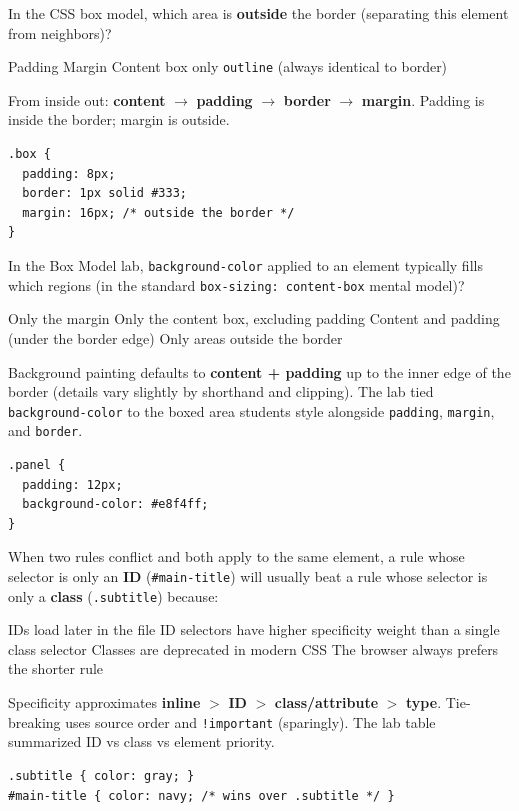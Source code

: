 \question[4]
In the CSS box model, which area is \textbf{outside} the border (separating this element from neighbors)?
\begin{choices}
  \choice Padding
  \CorrectChoice Margin
  \choice Content box only
  \choice \texttt{outline} (always identical to border)
\end{choices}
\begin{solution}
  From inside out: \textbf{content} $\rightarrow$ \textbf{padding} $\rightarrow$ \textbf{border} $\rightarrow$ \textbf{margin}. Padding is inside the border; margin is outside.
\begin{lstlisting}[style=cssinline]
.box {
  padding: 8px;
  border: 1px solid #333;
  margin: 16px; /* outside the border */
}
\end{lstlisting}
\end{solution}

\question[4]
In the Box Model lab, \texttt{background-color} applied to an element typically fills which regions (in the standard \texttt{box-sizing: content-box} mental model)?
\begin{choices}
  \choice Only the margin
  \choice Only the content box, excluding padding
  \CorrectChoice Content and padding (under the border edge)
  \choice Only areas outside the border
\end{choices}
\begin{solution}
  Background painting defaults to \textbf{content + padding} up to the inner edge of the border (details vary slightly by shorthand and clipping). The lab tied \texttt{background-color} to the boxed area students style alongside \texttt{padding}, \texttt{margin}, and \texttt{border}.
\begin{lstlisting}[style=cssinline]
.panel {
  padding: 12px;
  background-color: #e8f4ff;
}
\end{lstlisting}
\end{solution}


\newpage
\question[4]
When two rules conflict and both apply to the same element, a rule whose selector is only an \textbf{ID} (\texttt{\#main-title}) will usually beat a rule whose selector is only a \textbf{class} (\texttt{.subtitle}) because:
\begin{choices}
  \choice IDs load later in the file
  \CorrectChoice ID selectors have higher specificity weight than a single class selector
  \choice Classes are deprecated in modern CSS
  \choice The browser always prefers the shorter rule
\end{choices}
\begin{solution}
  Specificity approximates \textbf{inline} $>$ \textbf{ID} $>$ \textbf{class/attribute} $>$ \textbf{type}. Tie-breaking uses source order and \texttt{!important} (sparingly). The lab table summarized ID vs class vs element priority.
\begin{lstlisting}[style=cssinline]
.subtitle { color: gray; }
#main-title { color: navy; /* wins over .subtitle */ }
\end{lstlisting}
\end{solution}

